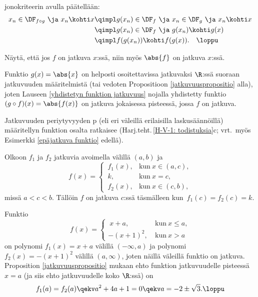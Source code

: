 jonokriteerin avulla päätellään:
\begin{align*}
x_n \in\DF_{f\circ g}\ \ja\ x_n \kohti x 
           &\qimpl g(x_n)\in\DF_f\ \ja\ x_n\in\DF_g\ \ja\ x_n \kohti x \\
           &\qimpl g(x_n)\in\DF_f\ \ja\ g(x_n) \kohti g(x) \\
           &\qimpl f(g(x_n)) \kohti f(g(x)). \quad\loppu
\end{align*}
\begin{Exa} \label{itseisarvon jatkuvuus} Näytä, että jos $f$ on jatkuva $x$:ssä, niin myös
$\abs{f}$ on jatkuva $x$:ssä. 
\end{Exa}
\ratk Funktio $g(x)=\abs{x}$ on helposti osoitettavissa jatkuvaksi $\R$:ssä suoraan
jatkuvuuden määritelmistä (tai vedoten Propositioon \ref{jatkuvuuspropositio} alla), joten
Lauseen \ref{yhdistetyn funktion jatkuvuus} nojalla yhdistetty funktio 
$(g \circ f)(x) = \abs{f(x)}$ on jatkuva jokaisessa pisteessä, jossa $f$ on jatkuva. \loppu

Jatkuvuuden periytyvyyden p (eli eri väleillä erilaisilla laskusäännöillä)
määritellyn funktion osalta ratkaisee
(Harj.teht.\,\ref{H-V-1: todistuksia}c; vrt.\ myös Esimerkki \ref{epäjatkuva funktio} edellä).
\begin{Prop} \label{jatkuvuuspropositio}
Olkoon $f_1$ ja $f_2$ jatkuvia avoimella välillä $(a,b)$ ja
\[
f(x) = \begin{cases} 
       \,f_1(x), &\text{kun}\ x \in (a,c), \\ 
       \,k, &\text{kun}\ x=c, \\ 
       \,f_2(x), &\text{kun}\ x \in (c,b),
       \end{cases} 
\]
missä $a<c<b$. Tällöin $f$ on jatkuva $c$:ssä täsmälleen kun $\,f_1(c)=f_2(c)=k$. 
\end{Prop}
\begin{Exa} Funktio
\[ f(x) = \begin{cases}
          \ x+a,\ &\text{kun}\ x \le a, \\ -(x+1)^2,\ &\text{kun}\ x > a 
          \end{cases} 
\] 
on polynomi $f_1(x)=x+a$ välillä $(-\infty,a)$ ja polynomi $f_2(x)=-(x+1)^2$ välillä
$(a,\infty)$, joten näillä väleillä funktio on jatkuva. Proposition \ref{jatkuvuuspropositio}
mukaan ehto funktion jatkuvuudelle pisteessä $x=a$ (ja siis ehto jatkuvuudelle koko $\R$:ssä)
on
\[
f_1(a)=f_2(a) \qekv a^2+4a+1=0 \qekv a = -2 \pm \sqrt{3}. \loppu
\]
\end{Exa}

